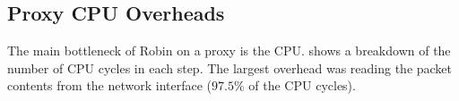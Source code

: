 



\subsection{Proxy CPU Overheads}
\label{sec:evaluation:cpu}



The main bottleneck of Robin on a proxy is the CPU\@.
 shows a breakdown of the number of CPU cycles in each
step. The largest overhead was reading the packet contents from the network
interface ($97.5\%$ of the CPU cycles).

